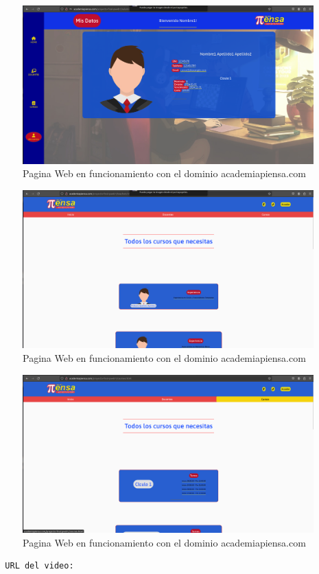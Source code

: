 \begin{figure}[H]
  \centering
  \includegraphics[width=1.0\textwidth]{img/AulaVirtual4.png}
  \caption{Pagina Web en funcionamiento con el dominio academiapiensa.com}
\end{figure}
\begin{figure}[H]
  \centering
  \includegraphics[width=1.0\textwidth]{img/Profesores.png}
  \caption{Pagina Web en funcionamiento con el dominio academiapiensa.com}
\end{figure}
\begin{figure}[H]
  \centering
  \includegraphics[width=1.0\textwidth]{img/Cursos.png}
  \caption{Pagina Web en funcionamiento con el dominio academiapiensa.com}
\end{figure}
\begin{verbatim}
  URL del video:
\end{verbatim}